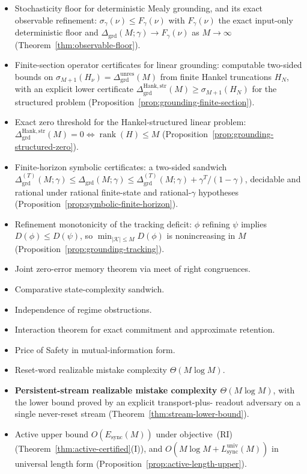 \documentclass[12pt]{article}
\theoremstyle{definition}
\DeclareMathOperator{\rank}{rank}
\newcommand{\Dunres}{\Delta_{\mathrm{grd}}^{\mathrm{unres}}}
\newcommand{\DHankstr}{\Delta_{\mathrm{grd}}^{\mathrm{Hank,str}}}
\newcommand{\Lsyncu}{L_{\mathrm{sync}}^{\mathrm{univ}}}
\newcommand{\Esync}{E_{\mathrm{sync}}}
\begin{document}
\begin{itemize}[leftmargin=1.6em]
\item Stochasticity floor for deterministic Mealy grounding, and its exact
observable refinement: $\sigma_\gamma(\nu)\le F_\gamma(\nu)$ with
$F_\gamma(\nu)$ the exact input-only deterministic floor and
$\Delta_{\mathrm{grd}}(M;\gamma)\to F_\gamma(\nu)$ as $M\to\infty$
(Theorem~\ref{thm:observable-floor}).
\item Finite-section operator certificates for linear grounding: computable
two-sided bounds on $\sigma_{M+1}(H_\nu)=\Dunres(M)$ from finite Hankel
truncations $H_N$, with an explicit lower certificate
$\DHankstr(M)\ge\sigma_{M+1}(H_N)$ for the structured problem
(Proposition~\ref{prop:grounding-finite-section}).
\item Exact zero threshold for the Hankel-structured linear problem:
$\DHankstr(M)=0\iff\rank(H)\le M$
(Proposition~\ref{prop:grounding-structured-zero}).
\item Finite-horizon symbolic certificates: a two-sided sandwich
$\Delta^{(T)}_{\mathrm{grd}}(M;\gamma)\le\Delta_{\mathrm{grd}}(M;\gamma)\le
\Delta^{(T)}_{\mathrm{grd}}(M;\gamma)+\gamma^T/(1-\gamma)$, decidable and
rational under rational finite-state and rational-$\gamma$ hypotheses
(Proposition~\ref{prop:symbolic-finite-horizon}).
\item Refinement monotonicity of the tracking deficit: $\phi$ refining $\psi$
implies $D(\phi)\le D(\psi)$, so $\min_{|\mathcal K|\le M}D(\phi)$ is
nonincreasing in $M$ (Proposition~\ref{prop:grounding-tracking}).
\item Joint zero-error memory theorem via meet of right congruences.
\item Comparative state-complexity sandwich.
\item Independence of regime obstructions.
\item Interaction theorem for exact commitment and approximate retention.
\item Price of Safety in mutual-information form.
\item Reset-word realizable mistake complexity $\Theta(M\log M)$.
\item \textbf{Persistent-stream realizable mistake complexity
$\Theta(M\log M)$}, with the lower bound proved by an explicit transport-plus-
readout adversary on a single never-reset stream
(Theorem~\ref{thm:stream-lower-bound}).
\item Active upper bound $O(\Esync(M))$ under objective~(RI)
(Theorem~\ref{thm:active-certified}(I)), and
$O(M\log M+\Lsyncu(M))$ in universal length form
(Proposition~\ref{prop:active-length-upper}).

\end{itemize}
\end{document}
